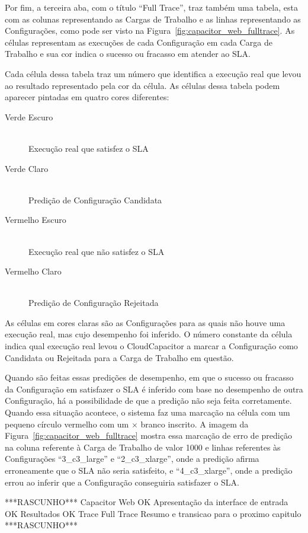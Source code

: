 Por fim, a terceira aba, com o título ``Full Trace'', traz também uma tabela, 
esta com as colunas representando as Cargas de Trabalho e as linhas representando
as Configurações, como pode ser visto na Figura~\ref{fig:capacitor_web_fulltrace}. 
As células representam as execuções de cada Configuração em cada Carga de Trabalho 
e sua cor indica o sucesso ou fracasso em atender ao SLA.

Cada célula dessa tabela traz um número que identifica a execução real que levou
ao resultado representado pela cor da célula. As células dessa tabela podem aparecer
pintadas em quatro cores diferentes:

\begin{description}
  \item[Verde Escuro] \hfill \\ Execução real que satisfez o SLA
  \item[Verde Claro] \hfill \\ Predição de Configuração Candidata
  \item[Vermelho Escuro] \hfill \\ Execução real que não satisfez o SLA
  \item[Vermelho Claro] \hfill \\ Predição de Configuração Rejeitada
\end{description}

As células em cores claras são as Configurações para as quais não houve uma execução
real, mas cujo desempenho foi inferido. O número constante da célula indica qual
execução real levou o CloudCapacitor a marcar a Configuração como Candidata ou 
Rejeitada para a Carga de Trabalho em questão.

Quando são feitas essas predições de desempenho, em que o sucesso ou fracasso
da Configuração em satisfazer o SLA é inferido com base no desempenho de outra
Configuração, há a possibilidade de que a predição não seja feita corretamente.
Quando essa situação acontece, o sistema faz uma marcação na célula com um pequeno
círculo vermelho com um $\times$ branco inscrito. A imagem da 
Figura~\ref{fig:capacitor_web_fulltrace} mostra essa marcação de erro de predição
na coluna referente à Carga de Trabalho de valor 1000 e linhas referentes às
Configurações ``3\_c3\_large'' e ``2\_c3\_xlarge'', onde a predição afirma erroneamente
que o SLA não seria satisfeito, e ``4\_c3\_xlarge'', onde a predição errou ao inferir 
que a Configuração conseguiria satisfazer o SLA. 
 
***RASCUNHO***
Capacitor Web
OK  Apresentação da interface de entrada
OK  Resultados
OK  Trace
  Full Trace
Resumo e transicao para o proximo capitulo
***RASCUNHO***

 
